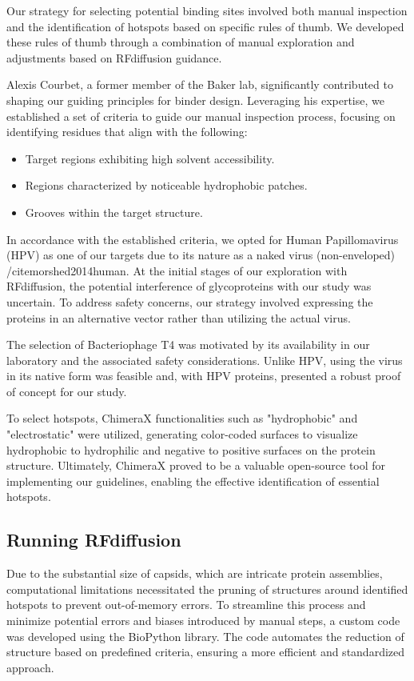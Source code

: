 \documentclass[11pt,a4paper]{article}
\begin{document}
Our strategy for selecting potential binding sites involved both manual inspection and the identification of hotspots based on specific rules of thumb. We developed these rules of thumb through a combination of manual exploration and adjustments based on RFdiffusion guidance.

Alexis Courbet, a former member of the Baker lab, significantly contributed to shaping our guiding principles for binder design. Leveraging his expertise, we established a set of criteria to guide our manual inspection process, focusing on identifying residues that align with the following:

\begin{itemize}
\item Target regions exhibiting high solvent accessibility.
\item Regions characterized by noticeable hydrophobic patches.
\item Grooves within the target structure.
\end{itemize}


In accordance with the established criteria, we opted for Human Papillomavirus (HPV) as one of our targets due to its nature as a naked virus (non-enveloped) /cite{morshed2014human}. At the initial stages of our exploration with RFdiffusion, the potential interference of glycoproteins with our study was uncertain. To address safety concerns, our strategy involved expressing the proteins in an alternative vector rather than utilizing the actual virus.

The selection of Bacteriophage T4 was motivated by its availability in our laboratory and the associated safety considerations. Unlike HPV, using the virus in its native form was feasible and, with HPV proteins, presented a robust proof of concept for our study.

To select hotspots, ChimeraX functionalities such as "hydrophobic" and "electrostatic" were utilized, generating color-coded surfaces to visualize hydrophobic to hydrophilic and negative to positive surfaces on the protein structure. Ultimately, ChimeraX proved to be a valuable open-source tool for implementing our guidelines, enabling the effective identification of essential hotspots.

\subsection{Running RFdiffusion}

Due to the substantial size of capsids, which are intricate protein assemblies, computational limitations necessitated the pruning of structures around identified hotspots to prevent out-of-memory errors. To streamline this process and minimize potential errors and biases introduced by manual steps, a custom code was developed using the BioPython library. The code automates the reduction of structure based on predefined criteria, ensuring a more efficient and standardized approach.
\end{document}
